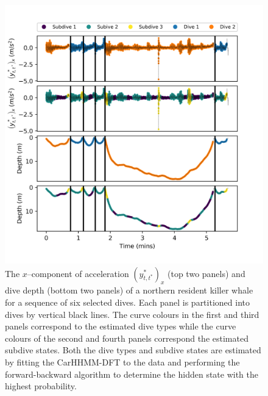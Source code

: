 \begin{figure}[ht]
	\centering
	\includegraphics[width=5in]{../Plots/CarHHMM2_decoded_dives.png}
	\caption{The $x$--component of acceleration $\left(y^*_{t,t^*}\right)_x$ (top two panels) and dive depth (bottom two panels) of a northern resident killer whale for a sequence of six selected dives. Each panel is partitioned into dives by vertical black lines. The curve colours in the first and third panels correspond to the estimated dive types while the curve colours of the second and fourth panels correspond the estimated subdive states. Both the dive types and subdive states are estimated by fitting the CarHHMM-DFT to the data and performing the forward-backward algorithm to determine the hidden state with the highest probability.}
	\label{fig:labeled_dives}
\end{figure}

